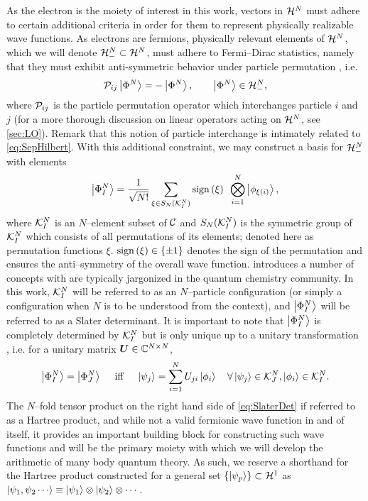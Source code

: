 As the electron is the moiety of interest in this work, vectors in $\mathcal{H}^N$ must adhere to certain additional 
criteria in order for them to represent physically realizable wave functions. As electrons are 
fermions, physically relevant elements of $\mathcal{H}^N$, which we will denote $\mathcal{H}^N_- \subset \mathcal{H}^N$, must 
adhere to Fermi--Dirac statistics, namely that they must exhibit anti-symmetric behavior under particle permutation
\cite{Walecka12_book,Schuck04_book}, i.e.
\begin{equation}
  \label{eq:FermiDirac}
  \mathcal{P}_{ij} \left\vert \Phi^N \right\rangle = -\left\vert \Phi^N \right\rangle, \qquad \left\vert \Phi^N \right\rangle \in \mathcal{H}^N_-,
\end{equation} 
where $\mathcal{P}_{ij}$ is the particle permutation operator which interchanges particle $i$ and $j$ 
(for a more thorough discussion on linear operators acting on $\mathcal{H}^N$, see \cref{sec:LO}). Remark
that this notion of particle interchange is intimately related to \cref{eq:SepHilbert}. With this additional
constraint, we may construct a basis for $\mathcal{H}^N_-$ with elements 
\begin{equation}
  \label{eq:SlaterDet}
  \left\vert \Phi^N_I \right\rangle = \frac{1}{\sqrt{N!}} \sum_{\xi \in S_N(\mathcal{K}^N_I)} \mathrm{sign}\left( \xi \right) \text{ } \bigotimes_{i = 1 }^N \left\vert \phi_{\xi(i)} \right\rangle,
\end{equation}
where $\mathcal{K}_I^N$ is an $N$--element subset of $\mathcal{C}$ and $S_N(\mathcal{K}_I^N)$ is the symmetric group
of $\mathcal{K}_I^N$ which consists of all permutations of its elements; denoted here as permutation
functions $\xi$. $\mathrm{sign}\left( \xi \right) \in \{ \pm 1 \}$ denotes the sign of the permutation and ensures the anti--symmetry of
the overall wave function.  introduces a number of concepts with are typically jargonized 
in the quantum chemistry community. In this work, $\mathcal{K}_I^N$ will be referred to as an $N$--particle
configuration (or simply a configuration when $N$ is to be understood from the context), and $\left\vert \Phi^N_I \right\rangle$
will be referred to as a Slater determinant. It is important to note that $\left\vert \Phi^N_I \right\rangle$ is completely 
determined by $\mathcal{K}_I^N$ but is only unique up to a unitary transformation \cite{Ostlund12_book}, i.e.
for a unitary matrix $\boldsymbol{U} \in \mathbb C^{N\times N}$,
\begin{equation}
\label{eq:UnitarySD}
\left\vert \Phi_I^N \right\rangle = \left\vert \Phi_J^N \right\rangle \quad \text{ iff } \quad \left\vert \psi_j \right\rangle = \sum_{i=1}^N U_{ji} \left\vert \phi_i \right\rangle \quad 
  \forall \left\vert \psi_j \right\rangle \in \mathcal{K}^N_J, \left\vert \phi_i \right\rangle \in \mathcal{K}^N_I.
\end{equation}
The $N$--fold tensor product on the right hand side of \cref{eq:SlaterDet}
if referred to as a Hartree product, and while not a valid fermionic wave function in and of itself,
it provides an important building block for constructing such wave functions and will be the primary
moiety with which we will develop the arithmetic of many body quantum theory. As such, we reserve a shorthand
for the Hartree product constructed for a general set $\left \lbrace \left\vert \psi_p \right\rangle \right\rbrace\subset\mathcal{H}^1$ as
$ \ket{\psi_1,\psi_2\cdots} \equiv \ket{\psi_1} \otimes \ket{\psi_2} \otimes \cdots$.

